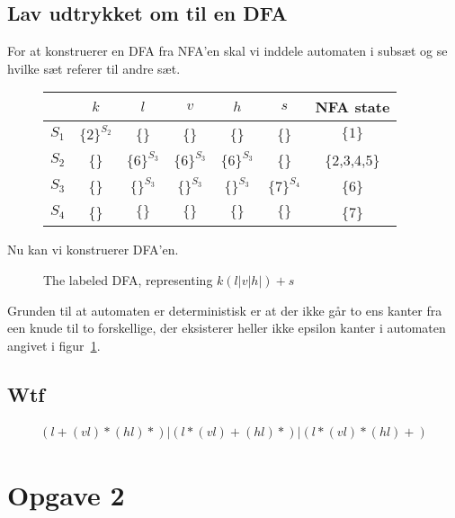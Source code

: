 \documentclass[11pt,a4paper]{article}
\begin{document}
\subsection{Lav udtrykket om til en DFA}
For at konstruerer en DFA fra NFA'en skal vi inddele automaten i subsæt og se hvilke sæt referer til andre sæt.
\begin{figure}[!ht]
    \centering
    \begin{tabular}{c|cccccc}
            &$k$&$l$&$v$&$h$&$s$&NFA state\\\hline
        $S_1$&$\{2\}^{S_2}$&\{\}&\{\}& \{\}&\{\}& $\{1\}$\\
        $S_2$&\{\}&$\{6\}^{S_3}$&$\{6\}^{S_3}$&$\{6\}^{S_3}$&\{\}&\{2,3,4,5\}\\
        $S_3$&\{\}&$\{\}^{S_3}$&$\{\}^{S_3}$&$\{\}^{S_3}$&$\{7\}^{S_4}$&\{6\}\\
        $S_4$&\{\}&$\{\}$&$\{\}$&$\{\}$&$\{\}$&\{7\}
    \end{tabular}
\end{figure}
Nu kan vi konstruerer DFA'en.
\begin{figure}[!ht]
    \centering
    \caption{The labeled DFA, representing $k(l|v|h|)+s$}\label{fig:examfigdfa}
\end{figure}
Grunden til at automaten er deterministisk er at der ikke går to ens kanter fra een knude til to forskellige, der eksisterer heller ikke epsilon kanter i automaten angivet i figur~\ref{fig:examfigdfa}.
\subsection{Wtf}
\begin{align*}
    (l+(vl)*(hl)*)|(l*(vl)+(hl)*)|(l*(vl)*(hl)+)
\end{align*}
\section{Opgave 2}
\end{document}
